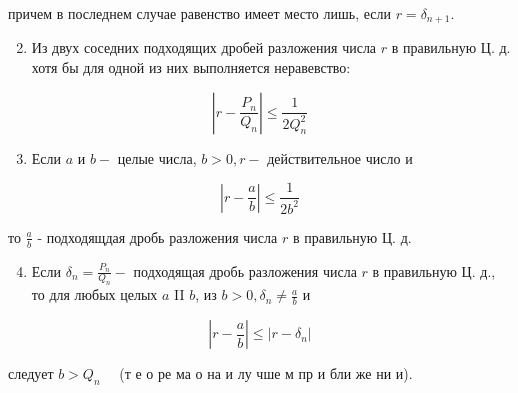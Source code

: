 \documentclass[10pt]{article}
\begin{document}
причем в последнем случае равенство имеет место лишь, если $r=\delta_{n+1}$.



\begin{enumerate}

  \setcounter{enumi}{1}

  \item Из двух соседних подходящих дробей разложения числа $r$ в правильную Ц. д. хотя бы для одной из них выполняется неравевство:

\end{enumerate}



\[

\left|r-\frac{P_{n}}{Q_{n}}\right| \leqslant \frac{1}{2 Q_{n}^{2}}

\]



\begin{enumerate}

  \setcounter{enumi}{2}

  \item Если $a$ и $b-$ целые числа, $b>0, r-$ действительное число и

\end{enumerate}



\[

\left|r-\frac{a}{b}\right| \leqslant \frac{1}{2 b^{2}}

\]



то $\frac{a}{b}$ - подходящдая дробь разложения числа $r$ в правильную Ц. д.



\begin{enumerate}

  \setcounter{enumi}{3}

  \item Если $\delta_{n}=\frac{P_{n}}{Q_{n}}-$ подходящая дробь разложения числа $r$ в правильную Ц. д., то для любых целых $a$ II $b$, из $b>0, \delta_{n} \neq \frac{a}{b}$ и

\end{enumerate}



\[

\left|r-\frac{a}{b}\right| \leqslant\left|r-\delta_{n}\right|

\]



следует $b>Q_{n} \quad$ (т е о ре ма о на и лу чше м пр и бли же ни и).
\end{document}
